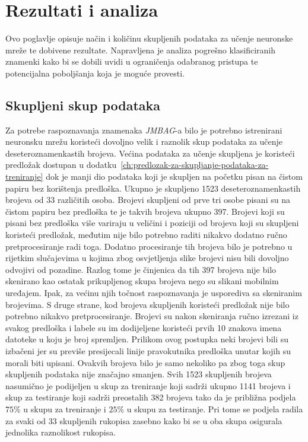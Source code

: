 \chapter{Rezultati i analiza}
\label{ch:rezultati-i-analiza}
Ovo poglavlje opisuje način i količinu skupljenih podataka za učenje neuronske mreže te dobivene rezultate. Napravljena
je analiza pogrešno klasificiranih znamenki kako bi se dobili uvidi u ograničenja odabranog pristupa te potencijalna
poboljšanja koja je moguće provesti.


\section{Skupljeni skup podataka}
\label{sec:skupljeni-skup-podataka}
Za potrebe raspoznavanja znamenaka \emph{JMBAG}-a bilo je potrebno istrenirani neuronsku mrežu koristeći dovoljno velik
i raznolik skup podataka za učenje deseteroznamenkastih brojeva. Većina podataka za učenje skupljena je koristeći
predložak dostupan u dodatku\ \ref{ch:predlozak-za-skupljanje-podataka-za-treniranje} dok je manji dio podataka koji je
skupljen na početku pisan na čistom papiru bez korištenja predloška. Ukupno je skupljeno 1523 deseteroznamenkastih
brojeva od 33 različitih osoba. Brojevi skupljeni od prve tri osobe pisani su na čistom papiru bez predloška te je
takvih brojeva ukupno 397. Brojevi koji su pisani bez predloška više variraju u veličini i poziciji od brojeva koji su
skupljeni koristeći predložak, međutim nije bilo potrebno raditi nikakvo dodatno ručno pretprocesiranje radi toga.
Dodatno procesiranje tih brojeva bilo je potrebno u rijetkim slučajevima u kojima zbog osvjetljenja slike brojevi nisu
bili dovoljno odvojivi od pozadine. Razlog tome je činjenica da tih 397 brojeva nije bilo skenirano kao ostatak
prikupljenog skupa brojeva nego su slikani mobilnim uređajem. Ipak, za većinu njih točnost raspoznavanja je usporediva
sa skeniranim brojevima. S druge strane, kod brojeva skupljenih koristeći predložak nije bilo potrebno nikakvo
pretprocesiranje. Brojevi su nakon skeniranja ručno izrezani iz svakog predloška i labele su im dodijeljene koristeći
prvih 10 znakova imena datoteke u koju je broj spremljen. Prilikom ovog postupka neki brojevi bili su izbačeni jer su
previše presijecali linije pravokutnika predloška unutar kojih su morali biti upisani. Ovakvih brojeva bilo je samo
nekoliko pa zbog toga skup skupljenih podataka nije značajno smanjen. Svih 1523 skupljenih brojeva nasumično je
podijeljen u skup za treniranje koji sadrži ukupno 1141 brojeva i skup za testiranje koji sadrži preostalih 382 brojeva
tako da je približna podjela $75\%$ u skupu za treniranje i $25\%$ u skupu za testiranje. Pri tome se podjela radila za
svaki od 33 skupljenih rukopisa zasebno kako bi se u oba skupa osigurala jednolika raznolikost rukopisa.


